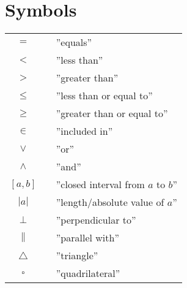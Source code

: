 



\section*{Symbols} \label{Symbol}
\renewcommand{\arraystretch}{1.2}
\begin{tabular}{@{}cp{0.4cm}l}
$ = $ && ''equals'' \\
$ < $ && ''less than'' \\
$ > $ && ''greater than'' \\
$ \leq $ && ''less than or equal to'' \\
$ \geq $ && ''greater than or equal to'' \\		
$ \in $ && ''included in'' \\
$ \vee $&&''or''\\
$ \wedge $&&''and''\\
$ [a, b] $ && ''closed interval from $ a $ to $ b $''\\
$|a| $ &&  ''length/absolute value of $ a $''\\
$\perp $ &&  ''perpendicular to'' \\
$\parallel $ &&  ''parallel with'' \\
$\triangle $ &&  ''triangle'' \\
$\square $ &&  ''quadrilateral'' \\
\end{tabular}
\renewcommand{\arraystretch}{1}

